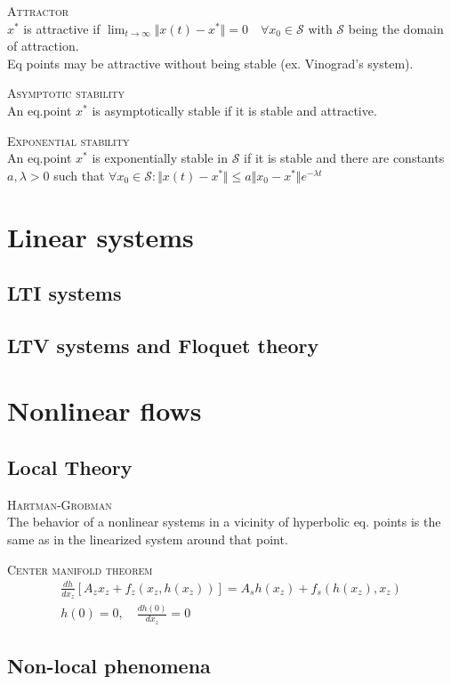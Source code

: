 \textsc{Attractor}\\
$x^*$ is attractive if $\lim_{t\rightarrow \infty} \Vert x(t)-x^* \Vert = 0 \quad \forall x_0 \in \mathcal{S}$ with $\mathcal{S}$ being the domain of attraction.\\
Eq points may be attractive without being stable (ex. Vinograd's system).

\textsc{Asymptotic stability}\\
An eq.point $x^*$ is asymptotically stable if it is stable and attractive.

\textsc{Exponential stability}\\
An eq.point $x^*$ is exponentially stable in $\mathcal{S}$ if it is stable and there are constants $a, \lambda > 0$ such that $\forall x_0 \in \mathcal{S}: \Vert x(t)-x^*\Vert \leq a\Vert x_0 - x^* \Vert e^{-\lambda t}$

\section{Linear systems}
\subsection{LTI systems}
\subsection{LTV systems and Floquet theory}
\section{Nonlinear flows}
\subsection{Local Theory}
\textsc{Hartman-Grobman}\\
The behavior of a nonlinear systems in a vicinity of hyperbolic eq. points is the same as in the linearized system around that point.

\textsc{Center manifold theorem}\\
\begin{align*}
\frac{dh}{dx_z}[A_zx_z+f_z(x_z, h(x_z))] = A_sh(x_z)+f_s(h(x_z),x_z) \\
h(0)=0, \quad \frac{dh(0)}{dx_z} = 0
\end{align*}


\subsection{Non-local phenomena}
